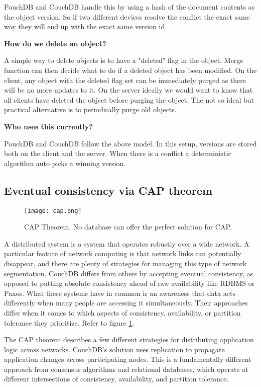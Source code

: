 PouchDB and CouchDB handle this by using a hash of the document contents as the object version. So if two 
different devices resolve the conflict the exact same way they will end up with the exact same version id.

\textbf{How do we delete an object?}

A simple way to delete objects is to have a "deleted" flag in the object. 
Merge function can then decide what to do if a deleted object has been modified. 
On the client, any object with the deleted flag set can be immediately purged as 
there will be no more updates to it. On the server ideally we would want to know 
that all clients have deleted the object before purging the object. The not so ideal 
but practical alternative is to periodically purge old objects.

\textbf{Who uses this currently?}

PouchDB and CouchDB follow the above model. In this setup, versions are stored both on the client and 
the server. When there is a conflict a deterministic algorithm auto picks a winning version.~\cite{HasuraOfflineFirst}

\subsection{Eventual consistency via CAP theorem}

\begin{figure}[h!]
    \begin{center}
        \texttt{[image: cap.png]}
    \end{center}
    \caption{CAP Theorem. No database can offer the perfect solution for CAP.}
    \label{fig:cap}
\end{figure}

A distributed system is a system that operates robustly over a wide network. 
A particular feature of network computing is that network links can potentially 
disappear, and there are plenty of strategies for managing this type of network 
segmentation. CouchDB differs from others by accepting eventual consistency, 
as opposed to putting absolute consistency ahead of raw availability like 
RDBMS or Paxos. What these systems have in common is an awareness that data 
acts differently when many people are accessing it simultaneously. 
Their approaches differ when it comes to which aspects of consistency, 
availability, or partition tolerance they prioritize. Refer to figure \ref{fig:cap}.

The CAP theorem describes a few different strategies for distributing application 
logic across networks. CouchDB’s solution uses replication to propagate application 
changes across participating nodes. This is a fundamentally different approach from 
consensus algorithms and relational databases, which operate at different intersections 
of consistency, availability, and partition tolerance.

